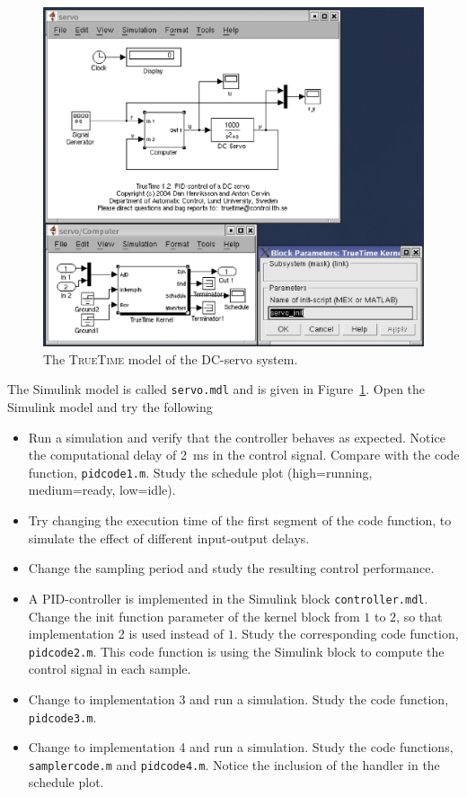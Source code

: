 \documentclass[final,twoside]{rapport}
\begin{document}
\begin{figure}[tbph]
  \begin{center}
    \includegraphics[scale=.65]{servo.ps}
  \end{center}
  \caption{The \textsc{TrueTime} model of the DC-servo system.}
  \label{fig:servo}
\end{figure}

The Simulink model is called \texttt{servo.mdl} and is given in
Figure~\ref{fig:servo}. Open the Simulink model and try the following

\begin{itemize}
\item Run a simulation and verify that the controller behaves as
  expected. Notice the computational delay of 2~ms in the control
  signal. Compare with the code function, \texttt{pidcode1.m}. Study
  the schedule plot (high=running, medium=ready, low=idle).
\item Try changing the execution time of the first segment of the code
  function, to simulate the effect of different input-output delays.
\item Change the sampling period and study the resulting control
  performance.
\item A PID-controller is implemented in the Simulink block
  \texttt{controller.mdl}. Change the init function parameter of the
  kernel block from $1$ to $2$, so that implementation 2 is used
  instead of $1$.
  Study the corresponding code function, \texttt{pidcode2.m}. This
  code function is using the Simulink block to compute the control
  signal in each sample.
\item Change to implementation 3 and run a simulation. Study the code
  function, \texttt{pidcode3.m}.
\item Change to implementation 4 and run a simulation. Study the code
  functions, \texttt{samplercode.m} and \texttt{pidcode4.m}. Notice
  the inclusion of the handler in the schedule plot.
\end{itemize} 
\end{document}
